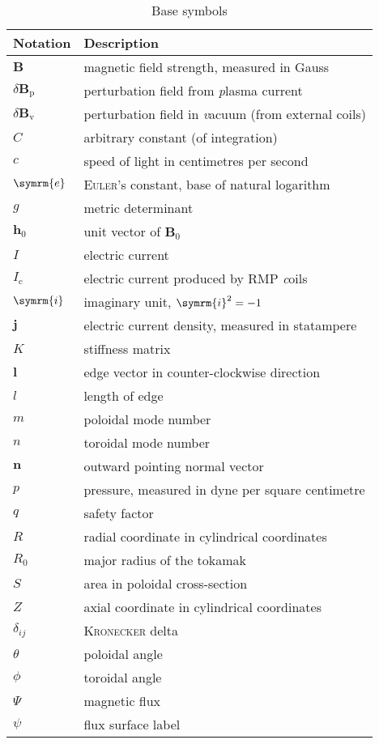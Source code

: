 \documentclass[a4paper, 10pt, english]{article}
\let\temp\varrho
\let\varrho\rho
\let\rho\temp
\let\temp\vartheta
\let\vartheta\theta
\let\theta\temp
\let\temp\varphi
\let\varphi\phi
\let\phi\temp
\let\vec\symbf
\newcommand*\e{\ensuremath{\symrm{e}}}  %
\newcommand*\im{\ensuremath{\symrm{i}}}  %
\begin{document}
\begin{longtable}{l >{\RaggedRight}p{}}
  \caption{Base symbols} \\
  \toprule
  \textbf{Notation} & \textbf{Description} \\
  \midrule
  \endhead
  $\vec{B}$ & magnetic field strength, measured in Gauss \\
  $\delta \vec{B}_{\text{p}}$ & perturbation field from \emph{p}lasma current \\
  $\delta \vec{B}_{\text{v}}$ & perturbation field in \emph{v}acuum (from external coils) \\
  $C$ & arbitrary constant (of integration) \\
  $c$ & speed of light in centimetres per second \\
  $\e$ & \textsc{Euler}'s constant, base of natural logarithm \\
  $g$ & metric determinant \\
  $\vec{h}_{0}$ & unit vector of $\vec{B}_{0}$ \\
  $I$ & electric current \\
  $I_{\text{c}}$ & electric current produced by RMP \emph{c}oils \\
  $\im$ & imaginary unit, $\im^{2} = -1$ \\
  $\vec{j}$ & electric current density, measured in statampere \\
  $K$ & stiffness matrix \\
  $\vec{l}$ & edge vector in counter-clockwise direction \\
  $l$ & length of edge \\
  $m$ & poloidal mode number \\
  $n$ & toroidal mode number \\
  $\vec{n}$ & outward pointing normal vector \\
  $p$ & pressure, measured in dyne per square centimetre \\
  $q$ & safety factor \\
  $R$ & radial coordinate in cylindrical coordinates \\
  $R_{0}$ & major radius of the tokamak \\
  $S$ & area in poloidal cross-section \\
  $Z$ & axial coordinate in cylindrical coordinates \\
  $\delta_{ij}$ & \textsc{Kronecker} delta \\
  $\theta$ & poloidal angle \\
  $\phi$ & toroidal angle \\
  $\Psi$ & magnetic flux \\
  $\psi$ & flux surface label \\
  \bottomrule
\end{longtable}
\end{document}
